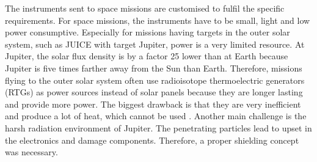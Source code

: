 	The instruments sent to space missions are customised to fulfil the specific requirements. For space missions, the instruments have to be small, light and low power consumptive. Especially for missions having targets in the outer solar system, such as JUICE with target Jupiter, power is a very limited resource. At Jupiter, the solar flux density is by a factor 25 lower than at Earth because Jupiter is five times farther away from the Sun than Earth. Therefore, missions flying to the outer solar system often use radioisotope thermoelectric generators (RTGs) as power sources instead of solar panels because they are longer lasting and provide more power. The biggest drawback is that they are very inefficient and produce a lot of heat, which cannot be used \cite{Power_Space}. Another main challenge is the harsh radiation environment of Jupiter. The penetrating particles lead to upset in the electronics and damage components. Therefore, a proper shielding concept was necessary.\\

